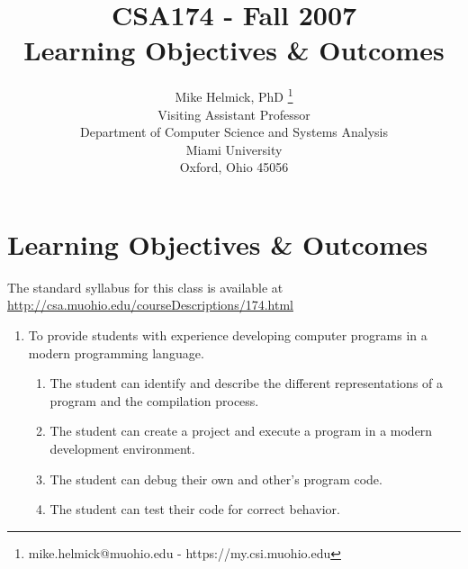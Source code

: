 \documentclass[10pt]{article}
\title{CSA174 - Fall 2007 \\ Learning Objectives \& Outcomes}
\author{ Mike Helmick, PhD \thanks{mike.helmick@muohio.edu - https://my.csi.muohio.edu} \\
Visiting Assistant Professor \\
Department of Computer Science and Systems Analysis \\
Miami University \\ Oxford, Ohio 45056 }
\date{}
\newif\ifpdf
\begin{document}
\ifpdf
\DeclareGraphicsExtensions{.pdf, .jpg, .tif}
\else
{}
\fi

\maketitle

\section{Learning Objectives \& Outcomes}

The standard syllabus for this class is available at \newline
\url{http://csa.muohio.edu/courseDescriptions/174.html}

\begin{enumerate}
	\item To provide students with experience developing computer programs in a modern programming language.
	\begin{enumerate}
		\item The student can identify and describe the different representations of a program and the compilation process.
		\item The student can create a project and execute a program in a modern development environment.
		\item The student can debug their own and other's program code.
		\item The student can test their code for correct behavior. 
		

\end{enumerate}
\end{enumerate}
\end{document}
